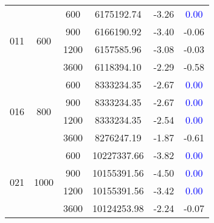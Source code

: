 \begin{table}[htbp]
{\begin{tabular}{cccccc}
    \midrule
    \multirow{4}{*}{011} & \multirow{4}{*}{600}  & 600     & 6175192.74                & -3.26                                                         & \textcolor{blue}{0.00}                        \\
                         &                       & 900     & 6166190.92      & -3.40                                                         & -0.06                                         \\
                         &                       & 1200    & 6157585.96                 & -3.08                                                         & -0.03                                         \\
                         &                       & 3600    & 6118394.10  & -2.29                                                         & -0.58                                         \\ 
    \midrule
    \multirow{4}{*}{016} & \multirow{4}{*}{800}  & 600     & 8333234.35                & -2.67                                                         & \textcolor{blue}{0.00}                        \\
                         &                       & 900     & 8333234.35      & -2.67                                                         & \textcolor{blue}{0.00}                        \\
                         &                       & 1200    & 8333234.35                 & -2.54                                                         & \textcolor{blue}{0.00}                        \\
                         &                       & 3600    & 8276247.19  & -1.87                                                         & -0.61                                         \\ 
    \midrule
    \multirow{4}{*}{021} & \multirow{4}{*}{1000} & 600     & 10227337.66               & -3.82                                                         & \textcolor{blue}{0.00}                        \\
                         &                       & 900     & 10155391.56     & -4.50                                                         & \textcolor{blue}{0.00}                        \\
                         &                       & 1200    & 10155391.56                & -3.42                                                         & \textcolor{blue}{0.00}                         \\
                         &                       & 3600    & 10124253.98 & -2.24                                                         & -0.07                                         \\
    \bottomrule
    \end{tabular}
    }
    \end{table} 